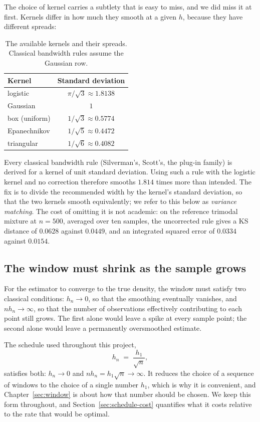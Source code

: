 \documentclass[11pt]{article}
\begin{document}
The choice of kernel carries a subtlety that is easy to miss, and we did miss it at first.
Kernels differ in how much they smooth at a given $h$, because they have different spreads:

\begin{table}[H]
\centering
\begin{tabular}{@{}lc@{}}
\toprule
\textbf{Kernel} & \textbf{Standard deviation} \\
\midrule
logistic & $\pi/\sqrt{3} \approx 1.8138$ \\
Gaussian & $1$ \\
box (uniform) & $1/\sqrt{3} \approx 0.5774$ \\
Epanechnikov & $1/\sqrt{5} \approx 0.4472$ \\
triangular & $1/\sqrt{6} \approx 0.4082$ \\
\bottomrule
\end{tabular}
\caption{The available kernels and their spreads. Classical bandwidth rules assume the
Gaussian row.}
\label{tab:kernels}
\end{table}

Every classical bandwidth rule (Silverman's, Scott's, the plug-in family) is derived
for a kernel of unit standard deviation. Using such a rule with the logistic kernel and no
correction therefore smooths $1.814$ times more than intended. The fix is to divide the
recommended width by the kernel's standard deviation, so that the two kernels smooth
equivalently; we refer to this below as \emph{variance matching}. The cost of omitting it is
not academic: on the reference trimodal mixture at $n = 500$, averaged over ten samples, the
uncorrected rule gives a KS distance of $0.0628$ against $0.0449$, and an integrated squared
error of $0.0334$ against $0.0154$.

\subsection{The window must shrink as the sample grows}

For the estimator to converge to the true density, the window must satisfy two classical
conditions: $h_n \to 0$, so that the smoothing eventually vanishes, and $n h_n \to \infty$,
so that the number of observations effectively contributing to each point still grows. The
first alone would leave a spike at every sample point; the second alone would leave a
permanently oversmoothed estimate.

The schedule used throughout this project,
\begin{equation}
h_n \;=\; \frac{h_1}{\sqrt{n}},
\label{eq:schedule}
\end{equation}
satisfies both: $h_n \to 0$ and $n h_n = h_1 \sqrt{n} \to \infty$. It reduces the choice of a
sequence of windows to the choice of a single number $h_1$, which is why it is convenient,
and Chapter~\ref{sec:window} is about how that number should be chosen. We keep this form
throughout, and Section~\ref{sec:schedule-cost} quantifies what it costs relative to the rate
that would be optimal.
\end{document}
